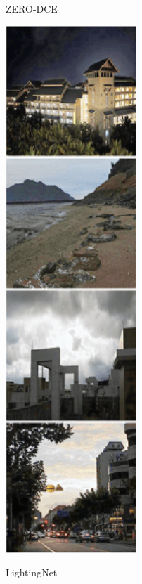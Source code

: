 \documentclass[CJK,aspectratio=169]{beamer}  %
\begin{document}
\begin{frame}
\begin{figure}
\begin{minipage}{.08\paperwidth}
			\label{fig: ZERO-DCE}	
			\caption*{\tiny ZERO-DCE}
		\end{minipage}
		\begin{minipage}{.08\paperwidth}
			\centering
			\setlength{\abovecaptionskip}{-0.45cm}
			\includegraphics[width=\linewidth]{picture/LLIE/LightingNet/LightingNet}
			\label{fig: LightingNet}	
			\caption*{\tiny LightingNet}
		\end{minipage}
		\captionsetup{font=scriptsize}
	\end{figure}
		
	\end{frame}
	
\end{document}
